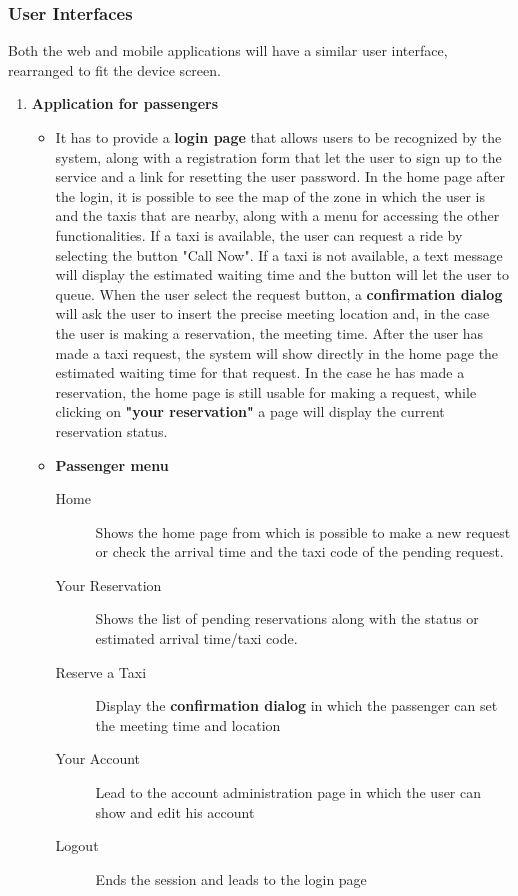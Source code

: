 \documentclass[11pt, a4paper,titlepage]{article}
\begin{document}
\subsubsection{User Interfaces}
Both the web and mobile applications will have a similar user interface, rearranged to fit the device screen.
\begin{enumerate}
	\item \textbf{Application for passengers} \newline
	\begin{itemize}
		\item It has to provide a \textbf{login page} that allows users to be recognized by the system, along with a registration form that let the user to sign up to the service and a link for resetting the user password.
		In the home page after the login, it is possible to see the map of the zone in which the user is and the taxis that are nearby, along with a menu for accessing the other functionalities. If a taxi is available, the user can request a ride by selecting the button "Call Now". If a taxi is not available, a text message will display the estimated waiting time and the button will let the user to queue. When the user select the request button, a \textbf{confirmation dialog} will ask the user to insert the precise meeting location and, in the case the user is making a reservation, the meeting time.
		After the user has made a taxi request, the system will show directly in the home page the  estimated waiting time for that request. In the case he has made a reservation, the home page is still usable for making a request, while clicking on \textbf{"your reservation"} a page will display the current reservation status.
		\item \textbf{Passenger menu}
		\begin{description}
			\item[Home] Shows the home page from which is possible to make a new request or check the arrival time and the taxi code of the pending request.
			\item[Your Reservation] Shows the list of pending reservations along with the status or estimated arrival time/taxi code.
			\item[Reserve a Taxi] Display the \textbf{confirmation dialog} in which the passenger can set the meeting time and location
			\item[Your Account] Lead to the account administration page in which the user can show and edit his account
			\item[Logout] Ends the session and leads to the login page

\end{description}
\end{itemize}
\end{enumerate}
\end{document}
